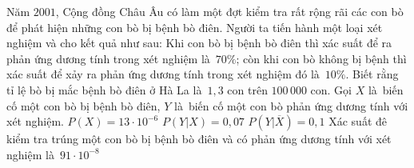 \begin{ex}%
	Năm $2001$, Cộng đồng Châu Âu có làm một đợt kiểm tra rất rộng rãi các con bò để phát hiện những con bò bị bệnh bò điên. Người  ta tiến hành một loại xét nghiệm và cho kết quả như sau: Khi con bò bị bệnh bò điên thì xác suất để ra phản ứng dương tính trong xét nghiệm là~$70\%$; còn khi con bò không bị bệnh thì xác suất để xảy ra phản ứng dương tính trong xét nghiệm đó là~$10\%$. Biết rằng tỉ lệ bò bị mắc bệnh bò điên ở Hà La là~$1{,}3$ con trên $100\,000$ con. Gọi $X$ là~biến cố một con bò bị bệnh bò điên, $Y$ là~biến cố một con bò phản ứng dương tính với xét nghiệm.
	\choiceTF 
		{\True $P\left(X \right) = 13 \cdot  10^{-6}$}
		{$P\left(  Y\big| X\right) = 0{,}07$}
		{\True $P\left(Y  \big| \overline{X} \right) = 0{,}1$}
		{Xác suất đê kiểm tra trúng một con bò bị bệnh bò  điên và có phản ứng dương tính với xét nghiệm là~$91 \cdot 10^{-8}$}
\end{ex}

